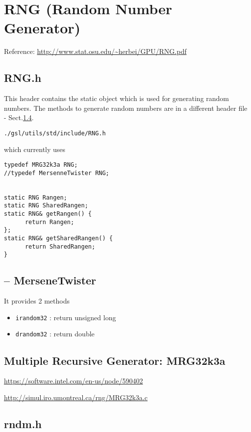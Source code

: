 \section{RNG (Random Number Generator)}
\label{sec:RNG}

Reference: \url{http://www.stat.osu.edu/~herbei/GPU/RNG.pdf}


\subsection{RNG.h}
\label{sec:RNG.h}

This header contains the static object which is used for generating random
numbers. The methods to generate random numbers are in a different header file -
Sect.\ref{sec:rndm.h}.


\begin{verbatim}
./gsl/utils/std/include/RNG.h
\end{verbatim}
which currently uses
\begin{lstlisting}
typedef MRG32k3a RNG;
//typedef MersenneTwister RNG;


static RNG Rangen;
static RNG SharedRangen;
static RNG& getRangen() {
      return Rangen;
};
static RNG& getSharedRangen() {
      return SharedRangen;
}
\end{lstlisting}


\subsection{-- MerseneTwister}
\label{sec:MerseneTwister}

It provides 2 methods
\begin{itemize}
  \item \verb!irandom32! : return unsigned long
  
  \item \verb!drandom32! : return double
\end{itemize}

\subsection{Multiple Recursive Generator: MRG32k3a}
\label{sec:MRG32k3a}

\url{https://software.intel.com/en-us/node/590402}

\url{http://simul.iro.umontreal.ca/rng/MRG32k3a.c}


\subsection{rndm.h}
\label{sec:rndm.h}


